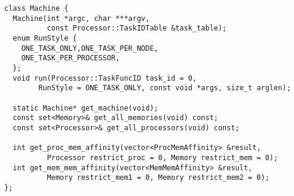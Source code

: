 


\begin{lstlisting}[float={t},label={lst:machineapi},caption={Machine Interface.}]
class Machine {
  Machine(int *argc, char ***argv,
          const Processor::TaskIDTable &task_table);
  enum RunStyle {
    ONE_TASK_ONLY,ONE_TASK_PER_NODE,
    ONE_TASK_PER_PROCESSOR,
  };
  void run(Processor::TaskFuncID task_id = 0, 
        RunStyle = ONE_TASK_ONLY, const void *args, size_t arglen);

  static Machine* get_machine(void);
  const set<Memory>& get_all_memories(void) const;
  const set<Processor>& get_all_processors(void) const;

  int get_proc_mem_affinity(vector<ProcMemAffinity> &result,
          Processor restrict_proc = 0, Memory restrict_mem = 0);
  int get_mem_mem_affinity(vector<MemMemAffinity> &result,
          Memory restrict_mem1 = 0, Memory restrict_mem2 = 0);
};
\end{lstlisting}


